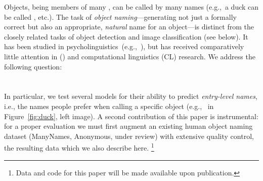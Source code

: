 Objects, being members of many \categories, can be called by many names (e.g.,~a duck can be called , etc.). 
The task of \emph{object naming}---generating not just a formally correct but also an appropriate, \emph{natural} name for an object---is distinct from the closely related tasks of object detection and image classification (see below).
It has been studied in psycholinguistics~(e.g.,~\citealt{Rosch1978}), but has received comparatively little attention in \langvis (\lv) and computational linguistics (CL) research.
We address the following question:\\
\\\\
In particular, we test several models for their ability to predict \emph{entry-level names}, i.e., the names people prefer when calling a specific object (e.g.,~ in Figure~\ref{fig:duck}, left image).
A second contribution of this paper is instrumental: for a proper evaluation we must first augment an existing human object naming dataset (ManyNames, Anonymous, under review) with extensive quality control, the resulting data which we also describe here.%
\footnote{Data and code for this paper will be made available upon publication.}
